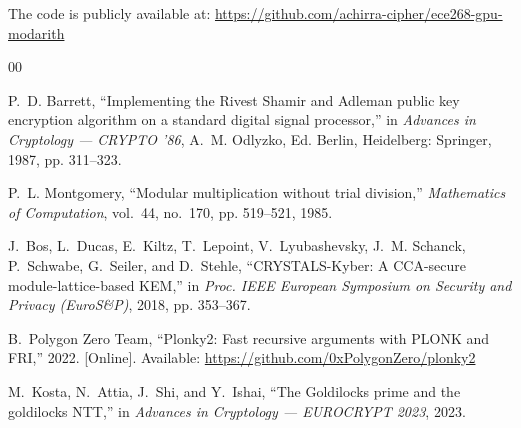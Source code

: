\documentclass[conference]{IEEEtran}
\begin{document}
The code is publicly available at: \url{https://github.com/achirra-cipher/ece268-gpu-modarith}

\begin{thebibliography}{00}

P.~D. Barrett, ``Implementing the Rivest Shamir and Adleman public key encryption algorithm on a
standard digital signal processor,'' in \textit{Advances in Cryptology --- CRYPTO '86}, A.~M.
Odlyzko, Ed. Berlin, Heidelberg: Springer, 1987, pp. 311--323.

P.~L. Montgomery, ``Modular multiplication without trial division,''
\textit{Mathematics of Computation}, vol.~44, no.~170, pp. 519--521, 1985.

J.~Bos, L.~Ducas, E.~Kiltz, T.~Lepoint, V.~Lyubashevsky, J.~M. Schanck, P.~Schwabe,
G.~Seiler, and D.~Stehle, ``CRYSTALS-Kyber: A CCA-secure module-lattice-based KEM,'' in
\textit{Proc. IEEE European Symposium on Security and Privacy (EuroS\&P)}, 2018, pp. 353--367.

B.~Polygon Zero Team, ``Plonky2: Fast recursive arguments with PLONK and FRI,'' 2022. [Online].
Available: \url{https://github.com/0xPolygonZero/plonky2}

M.~Kosta, N.~Attia, J.~Shi, and Y.~Ishai, ``The Goldilocks prime and the goldilocks NTT,''
in \textit{Advances in Cryptology --- EUROCRYPT 2023}, 2023.

\end{thebibliography}
\end{document}
